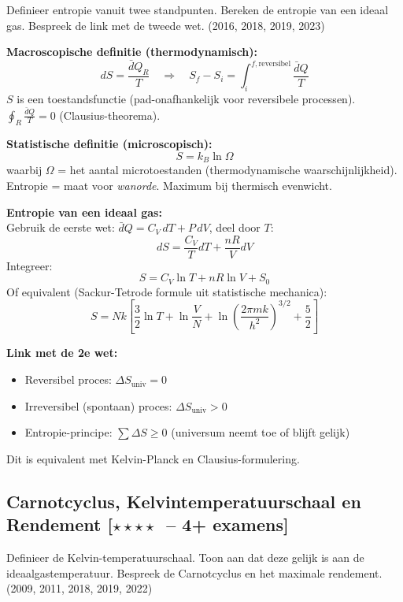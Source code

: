 \documentclass[10pt,a4paper]{article}
\newcommand{\dbar}{\bar{d}}
\begin{document}
\begin{theorievraag}{Definieer entropie vanuit twee standpunten. Bereken de entropie van een ideaal gas. Bespreek de link met de tweede wet. \textnormal{(2016, 2018, 2019, 2023)}}
\end{theorievraag}

\begin{oplossing}
\textbf{Macroscopische definitie (thermodynamisch):}
$$dS = \frac{\dbar Q_R}{T} \quad \Rightarrow \quad S_f - S_i = \int_i^{f,\text{reversibel}} \frac{\dbar Q}{T}$$
$S$ is een toestandsfunctie (pad-onafhankelijk voor reversibele processen). 
$\oint_R \frac{\dbar Q}{T} = 0$ (Clausius-theorema).

\textbf{Statistische definitie (microscopisch):}
$$S = k_B \ln\Omega$$
waarbij $\Omega$ = het aantal microtoestanden (thermodynamische waarschijnlijkheid).
Entropie = maat voor \emph{wanorde}. Maximum bij thermisch evenwicht.

\textbf{Entropie van een ideaal gas:}\\
Gebruik de eerste wet: $\dbar Q = C_V\,dT + P\,dV$, deel door $T$:
$$dS = \frac{C_V}{T}dT + \frac{nR}{V}dV$$
Integreer:
$$\boxed{S = C_V \ln T + nR \ln V + S_0}$$
Of equivalent (Sackur-Tetrode formule uit statistische mechanica):
$$S = Nk\left[\frac{3}{2}\ln T + \ln\frac{V}{N} + \ln\!\left(\frac{2\pi mk}{h^2}\right)^{3/2} + \frac{5}{2}\right]$$

\textbf{Link met de 2e wet:}
\begin{itemize}
  \item Reversibel proces: $\Delta S_\text{univ} = 0$
  \item Irreversibel (spontaan) proces: $\Delta S_\text{univ} > 0$
  \item Entropie-principe: $\sum \Delta S \geq 0$ (universum neemt toe of blijft gelijk)
\end{itemize}
Dit is equivalent met Kelvin-Planck en Clausius-formulering.
\end{oplossing}

\subsection{Carnotcyclus, Kelvintemperatuurschaal en Rendement \textnormal{\color{warningred}[$\star\star\star\star$\ -- 4+ examens]}}

\begin{theorievraag}{Definieer de Kelvin-temperatuurschaal. Toon aan dat deze gelijk is aan de ideaalgastemperatuur. Bespreek de Carnotcyclus en het maximale rendement. \textnormal{(2009, 2011, 2018, 2019, 2022)}}
\end{theorievraag}
\end{document}
